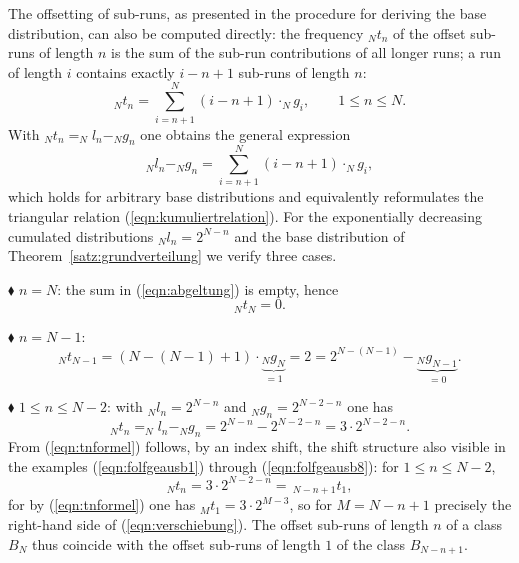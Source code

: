 \documentclass[11pt,a4paper]{scrartcl}
\theoremstyle{plain}
\theoremstyle{definition}
\theoremstyle{remark}
\begin{document}
The offsetting of sub-runs, as presented in the procedure for
deriving the base distribution, can also be computed directly: the
frequency $_Nt_n$ of the offset sub-runs of length $n$ is the sum of
the sub-run contributions of all longer runs; a run of length $i$
contains exactly $i-n+1$ sub-runs of length $n$:
\begin{equation}\label{eqn:abgeltung}
  _Nt_n=\sum_{i=n+1}^{N}\left(i-n+1\right)\cdot _Ng_i,\qquad 1\leq n\leq N.
\end{equation}
With $_Nt_n = _Nl_n - _Ng_n$ one obtains the general expression
\begin{equation}\label{eqn:abgegoltete}
  _Nl_n - _Ng_n=\sum_{i=n+1}^{N}\left(i-n+1\right)\cdot _Ng_i,
\end{equation}
which holds for arbitrary base distributions and equivalently
reformulates the triangular relation
(\ref{eqn:kumuliertrelation}). For the exponentially decreasing
cumulated distributions $_Nl_n=2^{N-n}$ and the base distribution of
Theorem~\ref{satz:grundverteilung} we verify three cases.

\noindent$\blacklozenge$ $n=N$: the sum in (\ref{eqn:abgeltung}) is
empty, hence
\begin{equation}
  _Nt_N=0.
\end{equation}

\noindent$\blacklozenge$ $n=N-1$:
\begin{equation}
  _Nt_{N-1}=\left(N-(N-1)+1\right)\cdot\underbrace{_Ng_N}_{=1}=2
  =2^{N-(N-1)}-\underbrace{_Ng_{N-1}}_{=0}.
\end{equation}

\noindent$\blacklozenge$ $1\leq n\leq N-2$: with $_Nl_n=2^{N-n}$ and
$_Ng_n=2^{N-2-n}$ one has
\begin{equation}\label{eqn:tnformel}
  _Nt_n=_Nl_n-_Ng_n=2^{N-n}-2^{N-2-n}=3\cdot 2^{N-2-n}.
\end{equation}
From (\ref{eqn:tnformel}) follows, by an index shift, the shift
structure also visible in the examples (\ref{eqn:folfgeausb1})
through (\ref{eqn:folfgeausb8}): for $1\leq n\leq N-2$,
\begin{equation}\label{eqn:verschiebung}
  _Nt_n=3\cdot 2^{N-2-n}=\,_{N-n+1}t_1,
\end{equation}
for by (\ref{eqn:tnformel}) one has $_Mt_1=3\cdot 2^{M-3}$, so for
$M=N-n+1$ precisely the right-hand side of
(\ref{eqn:verschiebung}). The offset sub-runs of length $n$ of a
class $B_N$ thus coincide with the offset sub-runs of length $1$ of
the class $B_{N-n+1}$.
\end{document}

